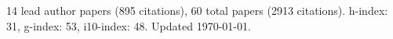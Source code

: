 14 lead author papers (895 citations),
60 total papers (2913 citations).\newline
h-index: 31, g-index: 53, i10-index: 48. Updated \today.